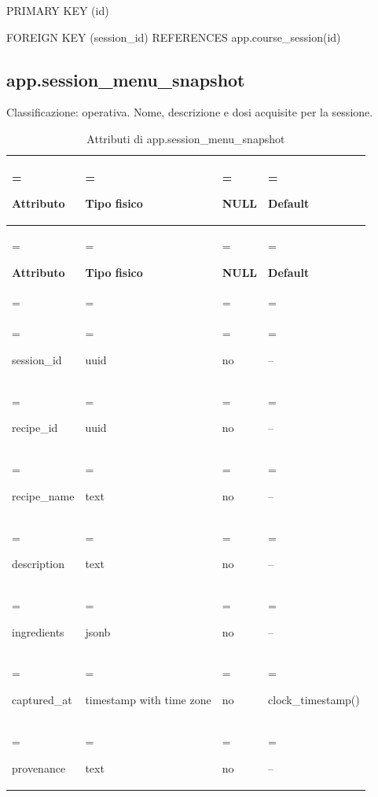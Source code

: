 \documentclass[11pt,a4paper]{article}
\begin{document}
{\ttfamily\small PRIMARY KEY (\allowbreak{}id)}\par

{\ttfamily\small FOREIGN KEY (\allowbreak{}session\_\allowbreak{}id) REFERENCES app.\allowbreak{}course\_\allowbreak{}session(\allowbreak{}id)}\par

\subsection{app.session\_menu\_snapshot}

Classificazione: operativa. Nome, descrizione e dosi acquisite per la sessione.

{\small \renewcommand{\arraystretch}{1.2}

\begin{xltabular}{\linewidth}{>{\hsize\linewidth=\hsize\raggedright\arraybackslash}X>{\hsize\linewidth=\hsize\raggedright\arraybackslash}X>{\hsize\linewidth=\hsize\raggedright\arraybackslash}X>{\hsize\linewidth=\hsize\raggedright\arraybackslash}X}
\caption{Attributi di app.session\_menu\_snapshot}\label{tab:dictionary-23}\\
\toprule

\textbf{Attributo} & \textbf{Tipo fisico} & \textbf{NULL} & \textbf{Default}\\\midrule\endfirsthead\toprule\textbf{Attributo} & \textbf{Tipo fisico} & \textbf{NULL} & \textbf{Default}\\\midrule\endhead
\midrule{}\\\endfoot\bottomrule\endlastfoot


{\ttfamily\small session\_\allowbreak{}id} & {\ttfamily\small uuid} & no & {\ttfamily\small --}\\\addlinespace[3pt]

{\ttfamily\small recipe\_\allowbreak{}id} & {\ttfamily\small uuid} & no & {\ttfamily\small --}\\\addlinespace[3pt]

{\ttfamily\small recipe\_\allowbreak{}name} & {\ttfamily\small text} & no & {\ttfamily\small --}\\\addlinespace[3pt]

{\ttfamily\small description} & {\ttfamily\small text} & no & {\ttfamily\small --}\\\addlinespace[3pt]

{\ttfamily\small ingredients} & {\ttfamily\small jsonb} & no & {\ttfamily\small --}\\\addlinespace[3pt]

{\ttfamily\small captured\_\allowbreak{}at} & {\ttfamily\small timestamp with time zone} & no & {\ttfamily\small clock\_\allowbreak{}timestamp(\allowbreak{})}\\\addlinespace[3pt]

{\ttfamily\small provenance} & {\ttfamily\small text} & no & {\ttfamily\small --}\\*

\end{xltabular}}
\end{document}
